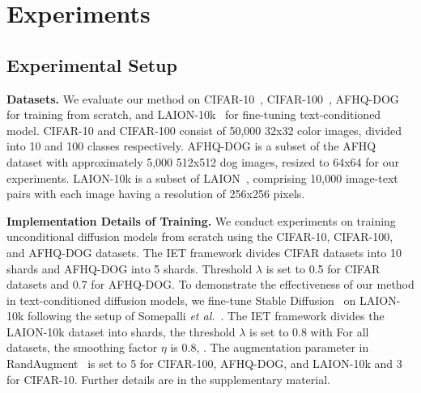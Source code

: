 \section{Experiments}
\subsection{Experimental Setup}
\label{sec:datasets}

\textbf{Datasets.}
We evaluate our method on CIFAR-10~\cite{krizhevsky2009learning}, CIFAR-100~\cite{krizhevsky2009learning}, AFHQ-DOG~\cite{choi2020stargan} for training from scratch, and LAION-10k~\cite{somepalli2024understanding} for fine-tuning text-conditioned model. 
CIFAR-10 and CIFAR-100 consist of 50,000 32x32 color images, divided into 10 and 100 classes respectively. 
AFHQ-DOG is a subset of the AFHQ dataset with approximately 5,000 512x512 dog images, resized to 64x64 for our experiments.
LAION-10k is a subset of LAION~\cite{schuhmann2021laion}, comprising 10,000 image-text pairs with each image having a resolution of 256x256 pixels.
\label{sec:setup}

\textbf{Implementation Details of Training.} 
We conduct experiments on training unconditional diffusion models from scratch using the CIFAR-10, CIFAR-100, and AFHQ-DOG datasets. 
The IET framework divides CIFAR datasets into 10 shards and AFHQ-DOG into 5 shards.
Threshold $\lambda$ is set to 0.5 for CIFAR datasets and 0.7 for AFHQ-DOG. 
To demonstrate the effectiveness of our method in text-conditioned diffusion models, we fine-tune Stable Diffusion~\cite{rombach2022high} on LAION-10k following the setup of Somepalli \MakeLowercase{\textit{et al.}}~\cite{somepalli2024understanding}.
The IET framework divides the LAION-10k dataset into  shards, the threshold $\lambda$ is set to 0.8 with 
For all datasets, the smoothing factor $\eta$ is 0.8, . The augmentation parameter in RandAugment~\cite{cubuk2020randaugment} is set to 5 for CIFAR-100, AFHQ-DOG, and LAION-10k  and 3 for CIFAR-10. 
Further details are in the supplementary material.

